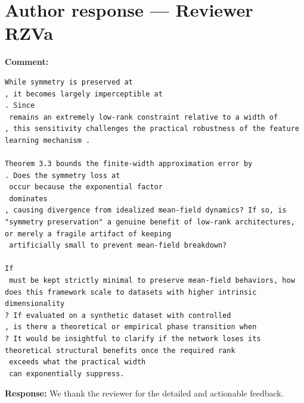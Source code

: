 \documentclass[11pt,a4paper]{article}
\begin{document}
\section*{Author response --- Reviewer RZVa}

\textbf{Comment:}
\begin{verbatim}
While symmetry is preserved at
, it becomes largely imperceptible at
. Since
 remains an extremely low-rank constraint relative to a width of
, this sensitivity challenges the practical robustness of the feature learning mechanism .

Theorem 3.3 bounds the finite-width approximation error by
. Does the symmetry loss at
 occur because the exponential factor
 dominates
, causing divergence from idealized mean-field dynamics? If so, is "symmetry preservation" a genuine benefit of low-rank architectures, or merely a fragile artifact of keeping
 artificially small to prevent mean-field breakdown?

If
 must be kept strictly minimal to preserve mean-field behaviors, how does this framework scale to datasets with higher intrinsic dimensionality
? If evaluated on a synthetic dataset with controlled
, is there a theoretical or empirical phase transition when
? It would be insightful to clarify if the network loses its theoretical structural benefits once the required rank
 exceeds what the practical width
 can exponentially suppress.
\end{verbatim}
\textbf{Response:} We thank the reviewer for the detailed and actionable feedback.
\end{document}
